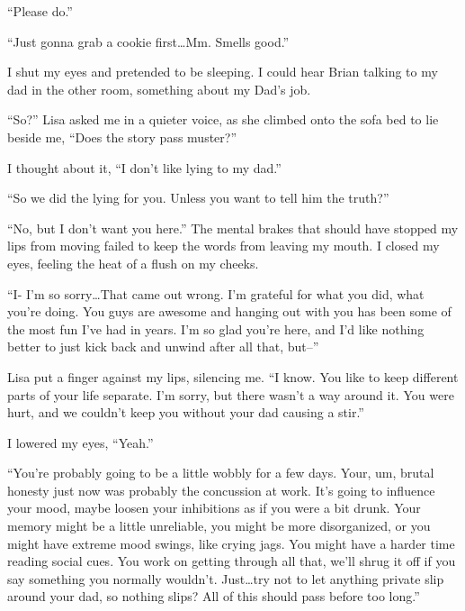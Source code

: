 ``Please do.''



``Just gonna grab a cookie first\ldots Mm.  Smells good.''



I shut my eyes and pretended to be sleeping.  I could hear Brian talking to my dad in the other room, something about my Dad's job.



``So?'' Lisa asked me in a quieter voice, as she climbed onto the sofa bed to lie beside me, ``Does the story pass muster?''



I thought about it, ``I don't like lying to my dad.''



``So we did the lying for you.  Unless you want to tell him the truth?''



``No, but I don't want you here.''  The mental brakes that should have stopped my lips from moving failed to keep the words from leaving my mouth.  I closed my eyes, feeling the heat of a flush on my cheeks.



``I- I'm so sorry\ldots That came out wrong.  I'm grateful for what you did, what you're doing.  You guys are awesome and hanging out with you has been some of the most fun I've had in years.  I'm so glad you're here, and I'd like nothing better to just kick back and unwind after all that, but--''



Lisa put a finger against my lips, silencing me.  ``I know.  You like to keep different parts of your life separate.  I'm sorry, but there wasn't a way around it.  You were hurt, and we couldn't keep you without your dad causing a stir.''



I lowered my eyes, ``Yeah.''



``You're probably going to be a little wobbly for a few days.  Your, um, brutal honesty just now was probably the concussion at work.  It's going to influence your mood, maybe loosen your inhibitions as if you were a bit drunk.  Your memory might be a little unreliable, you might be more disorganized, or you might have extreme mood swings, like crying jags.  You might have a harder time reading social cues.  You work on getting through all that, we'll shrug it off if you say something you normally wouldn't.  Just\ldots try not to let anything private slip around your dad, so nothing slips?  All of this should pass before too long.''



